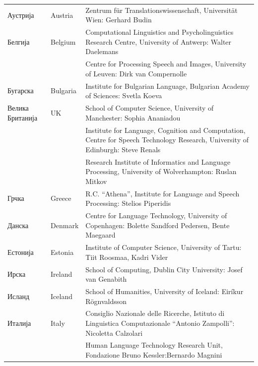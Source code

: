 \small
\begin{longtable}{llp{114mm}}
  Аустрија & \textcolor{grey1}{Austria} & Zentrum für Translationswissenschaft, Universität Wien: Gerhard Budin\\ \addlinespace 
  Белгија & \textcolor{grey1}{Belgium} & Computational Linguistics and Psycholinguistics Research Centre, University of Antwerp: Walter Daelemans\\ \addlinespace
  & & Centre for Processing Speech and Images, University of Leuven: Dirk van Compernolle \\ \addlinespace
  Бугарска & \textcolor{grey1}{Bulgaria} & Institute for Bulgarian Language, Bulgarian Academy of Sciences: Svetla Koeva \\ \addlinespace
  Велика Британија & \textcolor{grey1}{UK} & 
  School of Computer Science, University of Manchester: Sophia Ananiadou \\ \addlinespace 
  & & Institute for Language, Cognition and Computation, Centre for Speech Technology Research, University of Edinburgh: Steve Renals \\ \addlinespace 
  & & Research Institute of Informatics and Language Processing, University of Wolverhampton: Ruslan Mitkov \\ \addlinespace 
  Грчка & \textcolor{grey1}{Greece} & R.C. “Athena”, Institute for Language and Speech Processing: Stelios Piperidis\\ \addlinespace  
  Данска &  \textcolor{grey1}{Denmark} & Centre for Language Technology, University of Copenhagen: \newline Bolette Sandford Pedersen, Bente Maegaard\\ \addlinespace
  Естонија & \textcolor{grey1}{Estonia} & Institute of Computer Science, University of Tartu: Tiit Roosmaa, Kadri Vider\\ \addlinespace
  Ирска & \textcolor{grey1}{Ireland} & School of Computing, Dublin City University: Josef van Genabith\\\addlinespace
  Исланд &  \textcolor{grey1}{Iceland} & School of Humanities, University of Iceland: Eiríkur Rögnvaldsson\\\addlinespace
  Италија & \textcolor{grey1}{Italy} & Consiglio Nazionale delle Ricerche, Istituto di Linguistica Computazionale “Antonio Zampolli”: Nicoletta Calzolari\\ \addlinespace
  & & Human Language Technology Research Unit, Fondazione Bruno Kessler:\newline Bernardo Magnini\\

\end{longtable}
